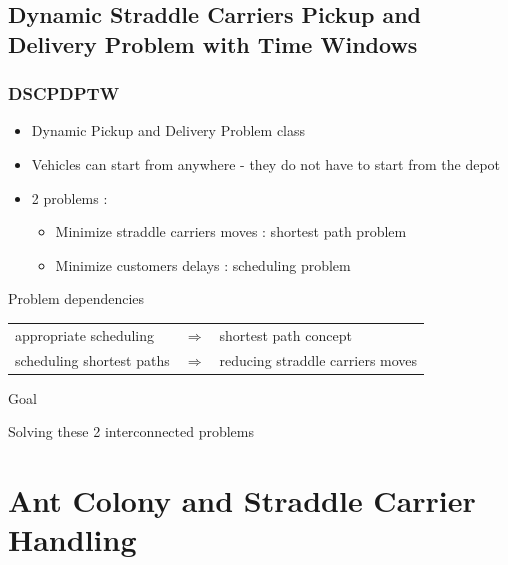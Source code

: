 \documentclass{beamer}
\begin{document}
\subsection*{Dynamic Straddle Carriers Pickup and Delivery Problem with Time Windows}
\begin{frame}
\frametitle{DSCPDPTW}
	\begin{itemize}
 		\item Dynamic Pickup and Delivery Problem class
		\item Vehicles can start from anywhere - they do not have to start from the depot
	\end{itemize}

	\begin{itemize}
	 \item 2 problems : 
		\begin{itemize}
 			\item Minimize straddle carriers moves : shortest path problem
			\item Minimize customers delays : scheduling problem
		\end{itemize}
	\end{itemize}
	
	
	\begin{alertblock}{Problem dependencies}
		\begin{tabular}{*{3}{l}}
			appropriate scheduling & $\Rightarrow$ & shortest path concept\\
			scheduling shortest paths & $\Rightarrow$ & reducing straddle carriers moves
		\end{tabular}
	\end{alertblock}

	\begin{block}{Goal}
		\begin{center}
		Solving these 2 interconnected problems
		\end{center}
	\end{block}	

\end{frame}


\section{Ant Colony and Straddle Carrier Handling}
\end{document}
